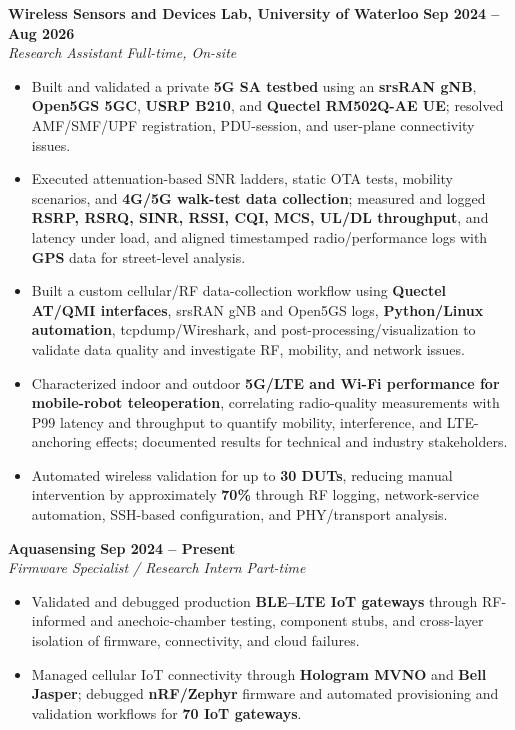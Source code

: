 \documentclass[letterpaper,10pt]{article}
\newcommand{\resumeSubheading}[4]{
  \textbf{#1} \hfill \textbf{#2} \\
  \textit{#3} \hfill \textit{#4} \\
}
\begin{document}
\resumeSubheading
{Wireless Sensors and Devices Lab, University of Waterloo}{Sep 2024 -- Aug 2026}
{Research Assistant}{Full-time, On-site}
\begin{itemize}
    \item Built and validated a private \textbf{5G SA testbed} using an \textbf{srsRAN gNB}, \textbf{Open5GS 5GC}, \textbf{USRP B210}, and \textbf{Quectel RM502Q-AE UE}; resolved AMF/SMF/UPF registration, PDU-session, and user-plane connectivity issues.
    \item Executed attenuation-based SNR ladders, static OTA tests, mobility scenarios, and \textbf{4G/5G walk-test data collection}; measured and logged \textbf{RSRP, RSRQ, SINR, RSSI, CQI, MCS, UL/DL throughput}, and latency under load, and aligned timestamped radio/performance logs with \textbf{GPS} data for street-level analysis.
    \item Built a custom cellular/RF data-collection workflow using \textbf{Quectel AT/QMI interfaces}, srsRAN gNB and Open5GS logs, \textbf{Python/Linux automation}, tcpdump/Wireshark, and post-processing/visualization to validate data quality and investigate RF, mobility, and network issues.
    \item Characterized indoor and outdoor \textbf{5G/LTE and Wi-Fi performance for mobile-robot teleoperation}, correlating radio-quality measurements with P99 latency and throughput to quantify mobility, interference, and LTE-anchoring effects; documented results for technical and industry stakeholders.
    \item Automated wireless validation for up to \textbf{30 DUTs}, reducing manual intervention by approximately \textbf{70\%} through RF logging, network-service automation, SSH-based configuration, and PHY/transport analysis.
\end{itemize}

\resumeSubheading
{Aquasensing}{Sep 2024 -- Present}
{Firmware Specialist / Research Intern}{Part-time}
\begin{itemize}
    \item Validated and debugged production \textbf{BLE--LTE IoT gateways} through RF-informed and anechoic-chamber testing, component stubs, and cross-layer isolation of firmware, connectivity, and cloud failures.
    \item Managed cellular IoT connectivity through \textbf{Hologram MVNO} and \textbf{Bell Jasper}; debugged \textbf{nRF/Zephyr} firmware and automated provisioning and validation workflows for \textbf{70 IoT gateways}.
\end{itemize}
\end{document}
